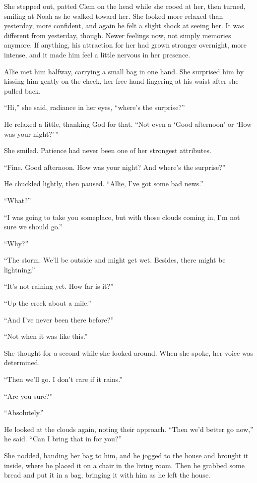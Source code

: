 \documentclass[10pt, twoside, openright]{book}
\begin{document}
She stepped out, patted Clem on the head while she cooed at her, then
turned, smiling at Noah as he walked toward her. She looked more relaxed
than yesterday, more confident, and again he felt a slight shock at
seeing her. It was different from yesterday, though. Newer feelings now,
not simply memories anymore. If anything, his attraction for her had
grown stronger overnight, more intense, and it made him feel a little
nervous in her presence.

Allie met him halfway, carrying a small bag in one hand. She surprised
him by kissing him gently on the cheek, her free hand lingering at his
waist after she pulled back.


``Hi,'' she said, radiance in her eyes, ``where's the surprise?''


He relaxed a little, thanking God for that. ``Not even a `Good
afternoon' or `How was your night?'\,''


She smiled. Patience had never been one of her strongest attributes.

``Fine. Good afternoon. How was your night? And where's the surprise?''

He chuckled lightly, then paused. ``Allie, I've got some bad news.''

``What?''


``I was going to take you someplace, but with those clouds coming in,
I'm not sure we should go.''


``Why?''


``The storm. We'll be outside and might get wet. Besides, there might be
lightning.''


``It's not raining yet. How far is it?''

``Up the creek about a mile.''

``And I've never been there before?''

``Not when it was like this.''


She thought for a second while she looked around. When she spoke, her
voice was determined.


``Then we'll go. I don't care if it rains.''

``Are you sure?''

``Absolutely.''


He looked at the clouds again, noting their approach. ``Then we'd better
go now,'' he said. ``Can I bring that in for you?''

She nodded, handing her bag to him, and he jogged to the house and
brought it inside, where he placed it on a chair in the living room.
Then he grabbed some bread and put it in a bag, bringing it with him as
he left the house.
\end{document}
